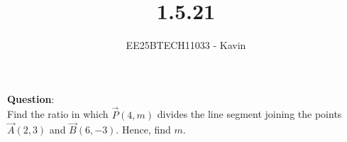 \documentclass[journal]{IEEEtran}
\begin{document}

\vspace{3cm}

\title{1.5.21}
\author{EE25BTECH11033 - Kavin}
{\let\newpage\relax\maketitle}

\renewcommand{\thefigure}{\theenumi}
\renewcommand{\thetable}{\theenumi}
\setlength{\intextsep}{10pt} %
\textbf{Question}:\\
Find the ratio in which $\vec{P}(4,m)$ divides the line segment joining the points $\vec{A}(2,3)$ and $\vec{B}(6,-3)$. Hence, find $m$.\\
\bigskip
\end{document}
